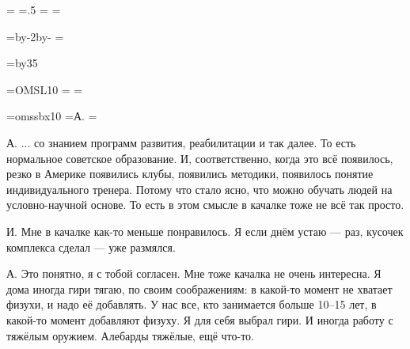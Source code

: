 \pdfpagewidth=297mm
\pdfpageheight=210mm
\pdfhorigin=1in
\pdfvorigin=0pt

\shhtotal=\pdfpagewidth
\htotal=.5\shhtotal
\vtotal=\pdfpageheight
\shoutline=0pt
\shstaplewidth=0pt
\shcrop=0pt
\shfootline={}
\shthickness=0pt

\horigin=9mm
\hoffset=1cm
\hsize=\htotal \advance\hsize by-2\horigin \advance\hsize by-\hoffset
\output={\ifodd\pageno\else\hoffset=0pt\fi \plainoutput}

\vorigin=15mm
\vsize=\topskip \advance\vsize by35\baselineskip

\font\TENSL=OMSL10
\headline={\line{\hrulefill}}
\footline={\line{\hss\tenrm\folio\hss}}

\font\speakerF=omssbx10
\def\A{\item{\speakerF А.}}
\def\I{\item{\speakerF И.}}
\def\L{\item{\speakerF Л.}}
\def\N{\item{\speakerF Н.}}
=\hbox{\speakerF А.\enskip}
\parindent=


\A
... со знанием программ развития, реабилитации и так далее.
То есть нормальное советское образование.
И, соответственно, когда это всё появилось,
резко в Америке появились клубы, появились методики,
появилось понятие индивидуального тренера.
Потому что стало ясно, что можно обучать людей на условно-научной основе.
То есть в этом смысле в качалке тоже не всё так просто.

\I
Мне в качалке как-то меньше понравилось.
Я если днём устаю --- раз, кусочек комплекса сделал --- уже размялся.

\A
Это понятно, я с тобой согласен.
Мне тоже качалка не очень интересна.
Я дома иногда гири тягаю, по своим соображениям:
в какой-то момент не хватает физухи, и надо её добавлять.
У нас все, кто занимается больше 10--15 лет, в какой-то момент добавляют физуху.
Я для себя выбрал гири. И иногда работу с тяжёлым оружием.
Алебарды тяжёлые, ещё что-то.

